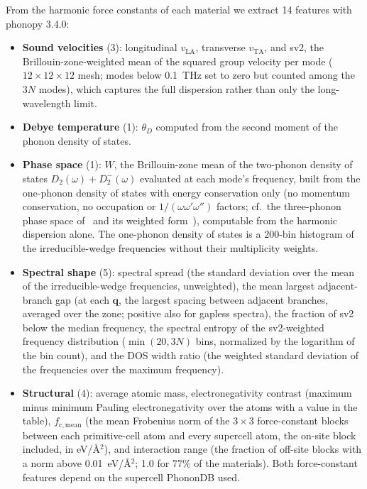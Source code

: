 \documentclass[aps,prm,reprint,onecolumn,groupedaddress]{revtex4-2}
\begin{document}
From the harmonic force constants of each material we extract 14 features with phonopy 3.4.0:

\begin{itemize}
\item \textbf{Sound velocities} (3): longitudinal $v_\mathrm{LA}$, transverse $v_\mathrm{TA}$, and sv2, the Brillouin-zone-weighted mean of the squared group velocity per mode ($12\times12\times12$ mesh; modes below 0.1~THz set to zero but counted among the $3N$ modes), which captures the full dispersion rather than only the long-wavelength limit.
\item \textbf{Debye temperature} (1): $\theta_D$ computed from the second moment of the phonon density of states.
\item \textbf{Phase space} (1): $W$, the Brillouin-zone mean of the two-phonon density of states $D_2(\omega) + D_2^-(\omega)$ evaluated at each mode's frequency, built from the one-phonon density of states with energy conservation only (no momentum conservation, no occupation or $1/(\omega\omega'\omega'')$ factors; cf.\ the three-phonon phase space of~\cite{lindsay2008} and its weighted form~\cite{li2014mingo}), computable from the harmonic dispersion alone. The one-phonon density of states is a 200-bin histogram of the irreducible-wedge frequencies without their multiplicity weights.
\item \textbf{Spectral shape} (5): spectral spread (the standard deviation over the mean of the irreducible-wedge frequencies, unweighted), the mean largest adjacent-branch gap (at each $\mathbf{q}$, the largest spacing between adjacent branches, averaged over the zone; positive also for gapless spectra), the fraction of sv2 below the median frequency, the spectral entropy of the sv2-weighted frequency distribution ($\min(20, 3N)$ bins, normalized by the logarithm of the bin count), and the DOS width ratio (the weighted standard deviation of the frequencies over the maximum frequency).
\item \textbf{Structural} (4): average atomic mass, electronegativity contrast (maximum minus minimum Pauling electronegativity over the atoms with a value in the table), $f_\mathrm{c,mean}$ (the mean Frobenius norm of the $3\times3$ force-constant blocks between each primitive-cell atom and every supercell atom, the on-site block included, in eV/\AA$^2$), and interaction range (the fraction of off-site blocks with a norm above 0.01~eV/\AA$^2$; 1.0 for 77\% of the materials). Both force-constant features depend on the supercell PhononDB used.
\end{itemize}
\end{document}
